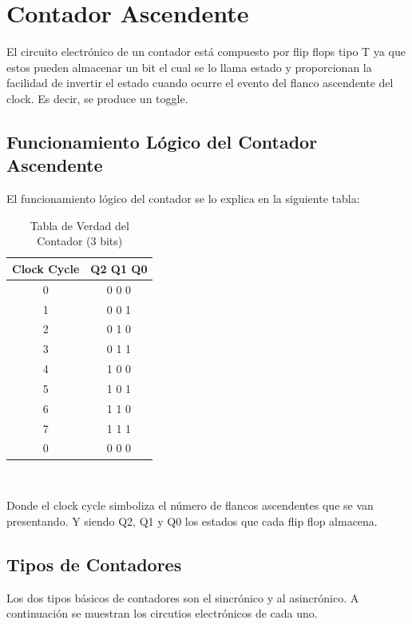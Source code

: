 \chapter{Contador Ascendente}
El circuito electr\'onico de un contador est\'a compuesto por flip flops tipo T ya que estos pueden almacenar un bit el cual se lo llama estado y proporcionan la facilidad de invertir el estado cuando ocurre el evento del flanco ascendente del clock. Es decir, se produce un toggle.
\section{Funcionamiento Lógico del Contador Ascendente}
El funcionamiento lógico del contador se lo explica en la siguiente tabla:
\begin{center}
	\begin{table}[h!]
		\begin{center}
			\caption{Tabla de Verdad del Contador (3 bits)}
			\begin{tabular}{|c|c|}
				\hline
				\textbf{Clock Cycle} & \textbf{Q2 Q1 Q0} \\
				\hline
				0 & 0 0 0\\
				\hline
				1 & 0 0 1\\
				\hline
				2 & 0 1 0\\
				\hline
				3 & 0 1 1\\
				\hline
				4 & 1 0 0\\
				\hline
				5 & 1 0 1\\
				\hline
				6 & 1 1 0\\
				\hline
				7 & 1 1 1\\
				\hline
				0 & 0 0 0\\
				\hline
			\end{tabular} \\
		\end{center}
	\end{table}
\end{center}
Donde el clock cycle simboliza el número de flancos ascendentes que se van presentando. Y siendo Q2, Q1 y Q0 los estados que cada flip flop almacena.

\section{Tipos de Contadores}
Los dos tipos básicos de contadores son el sincrónico y al asincrónico. A continuación se muestran los circutios electrónicos de cada uno.


